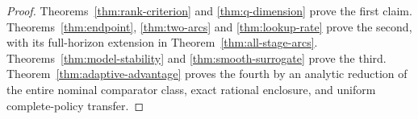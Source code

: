 \begin{proof}
Theorems~\ref{thm:rank-criterion} and \ref{thm:q-dimension} prove the first
claim. Theorems~\ref{thm:endpoint}, \ref{thm:two-arcs} and
\ref{thm:lookup-rate} prove the second, with its full-horizon extension in
Theorem~\ref{thm:all-stage-arcs}. Theorems~\ref{thm:model-stability} and
\ref{thm:smooth-surrogate} prove the third. Theorem~\ref{thm:adaptive-advantage}
proves the fourth by an analytic reduction of the entire nominal comparator
class, exact rational enclosure, and uniform complete-policy transfer.
\end{proof}
